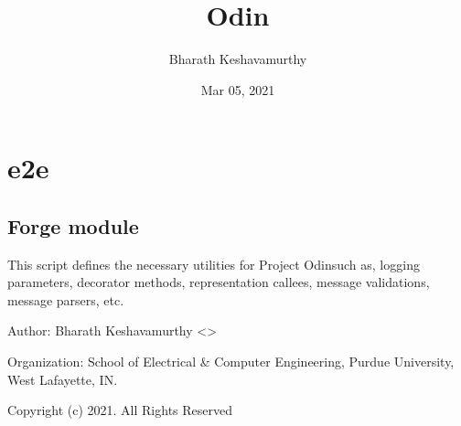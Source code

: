 \documentclass[letterpaper,10pt,english]{sphinxmanual}
\title{Odin}
\date{Mar 05, 2021}
\author{Bharath Keshavamurthy}
\begin{document}
\pagestyle{empty}
\sphinxmaketitle
\pagestyle{plain}
\sphinxtableofcontents
\pagestyle{normal}
\label{\detokenize{index::doc}}



\chapter{e2e}
\label{\detokenize{modules:e2e}}\label{\detokenize{modules::doc}}

\section{Forge module}
\label{\detokenize{Forge:module-Forge}}\label{\detokenize{Forge:forge-module}}\label{\detokenize{Forge::doc}}
\sphinxAtStartPar
This script defines the necessary utilities for Project Odin\textendash{}such as, logging parameters, decorator methods,
representation callees, message validations, message parsers, etc.

\sphinxAtStartPar
Author: Bharath Keshavamurthy \textless{}\textgreater{}

\sphinxAtStartPar
Organization: School of Electrical \& Computer Engineering, Purdue University, West Lafayette, IN.

\sphinxAtStartPar
Copyright (c) 2021. All Rights Reserved
\end{document}
